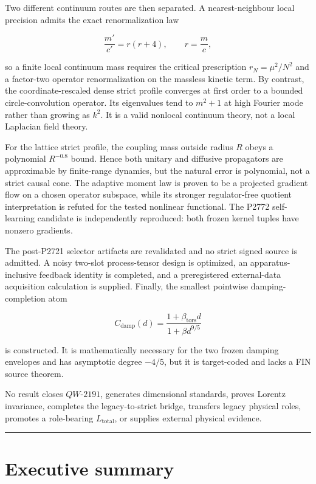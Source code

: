 \documentclass[11pt,a4paper,openany]{report}
\begin{document}
Two different continuum routes are then separated. A nearest-neighbour local precision admits the exact renormalization law

\[
\frac{m'}{c'}=r(r+4),\qquad r=\frac{m}{c},
\]

so a finite local continuum mass requires the critical prescription \(r_N=\mu^2/N^2\) and a factor-two operator renormalization on the massless kinetic term. By contrast, the coordinate-rescaled dense strict profile converges at first order to a bounded circle-convolution operator. Its eigenvalues tend to \(m^2+1\) at high Fourier mode rather than growing as \(k^2\). It is a valid nonlocal continuum theory, not a local Laplacian field theory.

For the lattice strict profile, the coupling mass outside radius \(R\) obeys a polynomial \(R^{-0.8}\) bound. Hence both unitary and diffusive propagators are approximable by finite-range dynamics, but the natural error is polynomial, not a strict causal cone. The adaptive moment law is proven to be a projected gradient flow on a chosen operator subspace, while its stronger regulator-free quotient interpretation is refuted for the tested nonlinear functional. The P2772 self-learning candidate is independently reproduced: both frozen kernel tuples have nonzero gradients.

The post-P2721 selector artifacts are revalidated and no strict signed source is admitted. A noisy two-slot process-tensor design is optimized, an apparatus-inclusive feedback identity is completed, and a preregistered external-data acquisition calculation is supplied. Finally, the smallest pointwise damping-completion atom

\[
C_{\mathrm{damp}}(d)
=\frac{1+\beta_{\mathrm{tors}}d}{1+\beta d^{9/5}}
\]

is constructed. It is mathematically necessary for the two frozen damping envelopes and has asymptotic degree \(-4/5\), but it is target-coded and lacks a FIN source theorem.

No result closes \(QW\text{-}2191\), generates dimensional standards, proves Lorentz invariance, completes the legacy-to-strict bridge, transfers legacy physical roles, promotes a role-bearing \(L_{\mathrm{total}}\), or supplies external physical evidence.

\par\medskip\hrule\medskip

\chapter{Executive summary}
\end{document}
